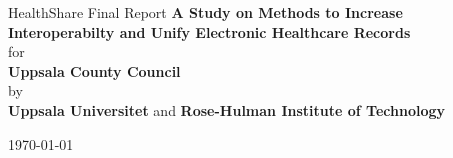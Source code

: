 \begin{titlepage}
\begin{center}

\textmd{\large{HealthShare Final Report}}
\vfill
 \huge{\textbf{A Study on Methods to Increase Interoperabilty and Unify Electronic Healthcare Records } }\\[2.0cm]
\large for\\
\large\textbf{Uppsala County Council}\\[1.0cm]
by\\
\large{\textbf{Uppsala Universitet}} and \large{\textbf{Rose-Hulman Institute of Technology}}\\[1.0cm]

\end{center}

\begin{center}
\vfill
\today\\
\end{center}

\end{titlepage}